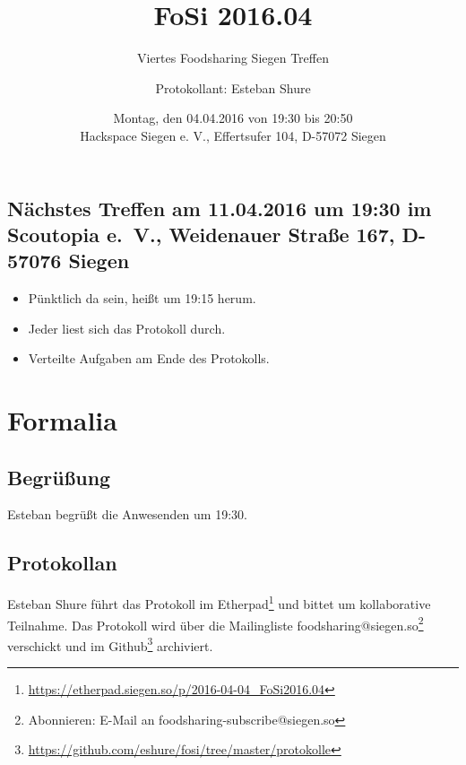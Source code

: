 \documentclass{scrreprt}
\begin{document}
\subject{Protokoll}
\title{FoSi 2016.04}
\subtitle{Viertes Foodsharing Siegen Treffen}
\author{Protokollant: Esteban Shure}
\date{Montag, den 04.04.2016 von 19:30 bis 20:50\\Hackspace Siegen e. V., Effertsufer 104, D-57072 Siegen}
\maketitle
\newpage
\tableofcontents
\newpage
\section{Nächstes Treffen am 11.04.2016 um 19:30 im Scoutopia e.~V., Weidenauer Straße 167, D-57076 Siegen}
	\begin{itemize}
		\item Pünktlich da sein, heißt um 19:15 herum.
		\item Jeder liest sich das Protokoll durch.
		\item Verteilte Aufgaben am Ende des Protokolls.
	\end{itemize}
\chapter{Formalia}
\section{Begrüßung}
Esteban begrüßt die Anwesenden um 19:30.
\section{Protokollan}
Esteban Shure führt das Protokoll im Etherpad\footnote{\url{https://etherpad.siegen.so/p/2016-04-04_FoSi2016.04}} und bittet um kollaborative Teilnahme.
Das Protokoll wird über die Mailingliste foodsharing@siegen.so\footnote{Abonnieren: E-Mail an foodsharing-subscribe@siegen.so} verschickt und im Github\footnote{\url{https://github.com/eshure/fosi/tree/master/protokolle}} archiviert.
\end{document}

